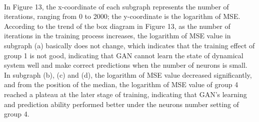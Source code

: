\documentclass[11pt,a4paper]{article}
\begin{document}
\\
In Figure 13, the x-coordinate of each subgraph represents the number of iterations, ranging from 0 to 2000; the y-coordinate is the logarithm of MSE. According to the trend of the box diagram in Figure 13, as the number of iterations in the training process increases, the logarithm of MSE value in subgraph (a) basically does not change, which indicates that the training effect of group 1 is not good, indicating that GAN cannot learn the state of dynamical system well and make correct predictions when the number of neurons is small. In subgraph  (b), (c) and (d), the logarithm of MSE value decreased significantly, and from the position of the median, the logarithm of MSE value of group 4 reached a plateau at the later stage of training, indicating that GAN's learning and prediction ability performed better under the neurons number setting of group 4.
\newpage
\end{document}
